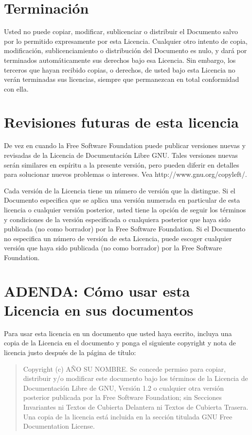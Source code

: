 \section{Terminación}

Usted no puede copiar, modificar, sublicenciar o distribuir el
Documento salvo por lo permitido expresamente por esta Licencia.
Cualquier otro intento de copia, modificación, sublicenciamiento o
distribución del Documento es nulo, y dará por terminados
automáticamente sus derechos bajo esa Licencia. Sin embargo, los
terceros que hayan recibido copias, o derechos, de usted bajo esta
Licencia no verán terminadas sus licencias, siempre que permanezcan en
total conformidad con ella.


\section{Revisiones futuras de esta licencia}

De vez en cuando la Free Software Foundation puede publicar versiones
nuevas y revisadas de la Licencia de Documentación Libre GNU. Tales
versiones nuevas serán similares en espíritu a la presente versión,
pero pueden diferir en detalles para solucionar nuevos problemas o
intereses. Vea http://www.gnu.org/copyleft/.

Cada versión de la Licencia tiene un número de versión que la
distingue. Si el Documento especifica que se aplica una versión
numerada en particular de esta licencia o cualquier versión posterior,
usted tiene la opción de seguir los términos y condiciones de la
versión especificada o cualquiera posterior que haya sido publicada
(no como borrador) por la Free Software Foundation. Si el Documento no
especifica un número de versión de esta Licencia, puede escoger
cualquier versión que haya sido publicada (no como borrador) por la
Free Software Foundation.


\section{ADENDA: Cómo usar esta Licencia en sus documentos}

Para usar esta licencia en un documento que usted haya escrito,
incluya una copia de la Licencia en el documento y ponga el siguiente
copyright y nota de licencia justo después de la página de título:

\begin{quote}
     Copyright (c) AÑO SU NOMBRE. Se concede permiso para copiar,
     distribuir y/o modificar este documento bajo los términos de la
     Licencia de Documentación Libre de GNU, Versión 1.2 o cualquier
     otra versión posterior publicada por la Free Software Foundation;
     sin Secciones Invariantes ni Textos de Cubierta Delantera ni Textos
     de Cubierta Trasera. Una copia de la licencia está incluida en la
     sección titulada GNU Free Documentation License.
\end{quote}

